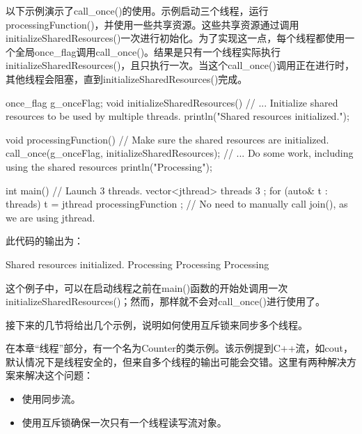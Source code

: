 
以下示例演示了call\_once()的使用。示例启动三个线程，运行processingFunction()，并使用一些共享资源。这些共享资源通过调用initializeSharedResources()一次进行初始化。为了实现这一点，每个线程都使用一个全局once\_flag调用call\_once()。结果是只有一个线程实际执行initializeSharedResources()，且只执行一次。当这个call\_once()调用正在进行时，其他线程会阻塞，直到initializeSharedResources()完成。

\begin{cpp}
once_flag g_onceFlag;
void initializeSharedResources()
{
    // ... Initialize shared resources to be used by multiple threads.
    println("Shared resources initialized.");
}

void processingFunction()
{
    // Make sure the shared resources are initialized.
    call_once(g_onceFlag, initializeSharedResources);
    // ... Do some work, including using the shared resources
    println("Processing");
}

int main()
{
    // Launch 3 threads.
    vector<jthread> threads { 3 };
    for (auto& t : threads) {
        t = jthread { processingFunction };
    }
    // No need to manually call join(), as we are using jthread.
}
\end{cpp}

此代码的输出为：

\begin{shell}
Shared resources initialized.
Processing
Processing
Processing
\end{shell}

这个例子中，可以在启动线程之前在main()函数的开始处调用一次initializeSharedResources()；然而，那样就不会对call\_once()进行使用了。


接下来的几节将给出几个示例，说明如何使用互斥锁来同步多个线程。


在本章“线程”部分，有一个名为Counter的类示例。该示例提到C++流，如cout，默认情况下是线程安全的，但来自多个线程的输出可能会交错。这里有两种解决方案来解决这个问题：

\begin{itemize}
\item
使用同步流。

\item
使用互斥锁确保一次只有一个线程读写流对象。
\end{itemize}

